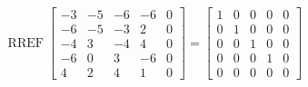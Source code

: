 \begin{exerciseAnswer} 


\[\operatorname{RREF} \left[\begin{array}{cccc|c}
-3 & -5 & -6 & -6 & 0 \\
-6 & -5 & -3 & 2 & 0 \\
-4 & 3 & -4 & 4 & 0 \\
-6 & 0 & 3 & -6 & 0 \\
4 & 2 & 4 & 1 & 0
\end{array}\right] = \left[\begin{array}{cccc|c}
1 & 0 & 0 & 0 & 0 \\
0 & 1 & 0 & 0 & 0 \\
0 & 0 & 1 & 0 & 0 \\
0 & 0 & 0 & 1 & 0 \\
0 & 0 & 0 & 0 & 0
\end{array}\right] \]



\end{exerciseAnswer}
